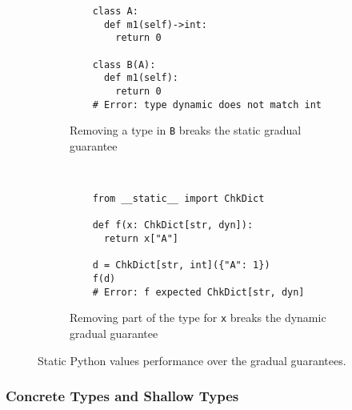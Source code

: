 \documentclass[english,cleveref,submission]{programming}
\newcommand{\SP}{Static Python}
\newcommand{\code}[1]{\texttt{#1}}
\begin{document}
\begin{figure}
  \begin{subfigure}[t]{0.5\columnwidth}
  \begin{verbatim}
    class A:
      def m1(self)->int:
        return 0

    class B(A):
      def m1(self):
        return 0
    # Error: type dynamic does not match int
  \end{verbatim}
    \caption{Removing a type in \code{B} breaks the static gradual guarantee}
    \label{f:gg-failure-stat}
  \end{subfigure}
  ~
  \begin{subfigure}[t]{0.5\columnwidth}
  \begin{verbatim}
    from __static__ import ChkDict

    def f(x: ChkDict[str, dyn]):
      return x["A"]

    d = ChkDict[str, int]({"A": 1})
    f(d)
    # Error: f expected ChkDict[str, dyn]
  \end{verbatim}
    \caption{Removing part of the type for \code{x} breaks the dynamic gradual guarantee}
    \label{f:gg-failure-dyn}
  \end{subfigure}
  \caption{\SP{} values performance over the gradual guarantees.}
  \label{fig:gg-failure}
\end{figure}



\subsubsection{Concrete Types and Shallow Types}
\label{s:checked-type}
\end{document}
